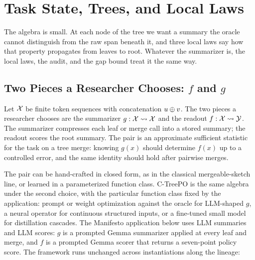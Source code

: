 \section{Task State, Trees, and Local Laws}\label{sec:min-framework}
\label{sec:min-manifesto-state}

The algebra is small. At each node of the tree we want a summary the
oracle cannot distinguish from the raw span beneath it, and three local
laws say how that property propagates from leaves to root. Whatever the
summarizer is, the local laws, the audit, and the gap bound treat it the
same way.

\subsection{Two Pieces a Researcher Chooses: $f$ and $g$}\label{sec:min-fg-pieces}

Let $\mathcal{X}$ be finite token sequences with concatenation
$u \oplus v$. The two pieces a researcher chooses are the summarizer
$g:\mathcal{X}\rightsquigarrow\mathcal{X}$ and the readout
$f:\mathcal{X}\rightsquigarrow\mathcal{Y}$. The summarizer compresses each leaf
or merge call into a stored summary; the readout scores the root summary.
The pair is an approximate sufficient statistic for the task on a
tree merge: knowing $g(x)$ should determine $f(x)$ up to a controlled
error, and the same identity should hold after pairwise merges.

The pair can be hand-crafted in closed form, as in the classical
mergeable-sketch line, or learned in a parameterized function class.
C-TreePO is the same algebra under the second choice, with the
particular function class fixed by the application: prompt or weight
optimization against the oracle for LLM-shaped $g$, a neural operator
\citep{Kovachki23NeuralOperator} for continuous structured inputs, or
a fine-tuned small model for distillation cascades. The Manifesto
application below uses LLM summaries and LLM scores: $g$ is a
prompted Gemma summarizer applied at every leaf and merge, and $f$ is
a prompted Gemma scorer that returns a seven-point policy score. The
framework runs unchanged across instantiations along the lineage:


